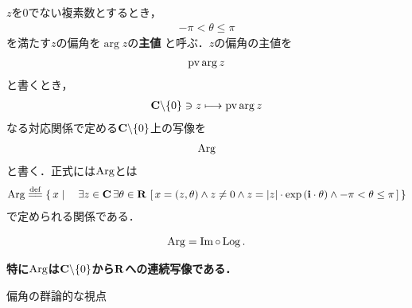 	$z$を$0$でない複素数とするとき，
	\begin{align}
		-\pi < \theta \leq \pi
	\end{align}
	を満たす$z$の偏角を$\arg{z}$の{\bf 主値}
	と呼ぶ．$z$の偏角の主値を
	\begin{align}
		\operatorname{pv}{\arg{z}}
	\end{align}
	と書くとき，
	\begin{align}
		\mathbf{C} \backslash \{0\} \ni z \longmapsto \operatorname{pv}{\arg{z}}
	\end{align}
	なる対応関係で定める$\mathbf{C} \backslash \{0\}$上の写像を
	\begin{align}
		\operatorname{Arg}
	\end{align}
	と書く．正式には$\operatorname{Arg}$とは
	\begin{align}
		\pvarg \defeq \Set{x}{\exists z \in \C\, \exists \theta \in \R\, 
		\left[\, x=(z,\theta) \wedge z \neq 0 \wedge z = |z| \cdot \exp{(\isym \cdot \theta)} \wedge
		-\pi < \theta \leq \pi\, \right]}
	\end{align}
	で定められる関係である．
	
	\begin{screen}
		\begin{thm}[偏角の主値は対数の主値の虚部]
			\begin{align}
				\operatorname{Arg} = \operatorname{Im} \circ \operatorname{Log}.
			\end{align}
		\end{thm}
	\end{screen}
	
	\begin{sketch}
		
	\end{sketch}
	
	{\bf 特に$\operatorname{Arg}$は$\mathbf{C} \backslash \{0\}$から$\mathbf{R}$への連続写像である．}
	
	\begin{itembox}[l]{偏角の群論的な視点}
		
	\end{itembox}